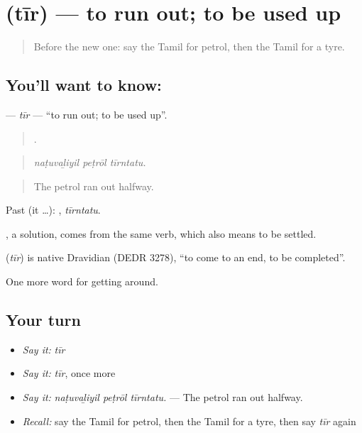 \section[\texorpdfstring{\ta{தீர்} (tīr)}{தீர் (tīr)}]{ (tīr) — to run out; to be used up}

\label{lesson:TA-C406-tir}



\begin{quote}
Before the new one: say the Tamil for petrol, then the Tamil for a tyre.
\end{quote}

\subsection*{You'll want to know: }
\textbf{} — \emph{tīr} — \textquotedblleft{}to run out; to be used up\textquotedblright{}.

\begin{quote}
  .
\end{quote}

\begin{quote}
\emph{naṭuvaḻiyil peṭrōl tīrntatu.}
\end{quote}

\begin{quote}
The petrol ran out halfway.
\end{quote}

Past (it …): , \emph{tīrntatu}.

, a solution, comes from the same verb, which also means to be settled.

\begin{cousinweb}
\textbf{} (\emph{tīr}) is native Dravidian (DEDR 3278), \textquotedblleft{}to come to an end, to be completed\textquotedblright{}.
\end{cousinweb}

\begin{grammarlens}[title={What you've built}]
One more word for getting around.
\end{grammarlens}

\subsection*{Your turn}
\begin{itemize}
\raggedright
  \item \emph{Say it:} \emph{tīr}
  \item \emph{Say it:} \emph{tīr}, once more
  \item \emph{Say it:} \emph{naṭuvaḻiyil peṭrōl tīrntatu.} — The petrol ran out halfway.
  \item \emph{Recall:} say the Tamil for petrol, then the Tamil for a tyre, then say \emph{tīr} again
\end{itemize}

